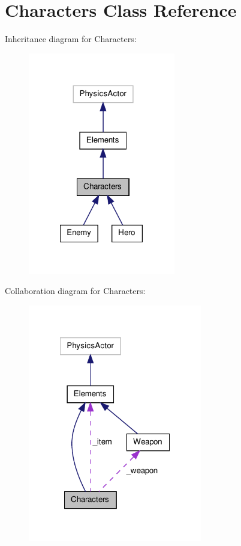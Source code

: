 \hypertarget{class_characters}{\section{Characters Class Reference}
\label{class_characters}
}


Inheritance diagram for Characters\-:\nopagebreak
\begin{figure}[H]
\begin{center}
\leavevmode
\includegraphics[width=182pt]{class_characters__inherit__graph}
\end{center}
\end{figure}


Collaboration diagram for Characters\-:\nopagebreak
\begin{figure}[H]
\begin{center}
\leavevmode
\includegraphics[width=215pt]{class_characters__coll__graph}
\end{center}
\end{figure}
